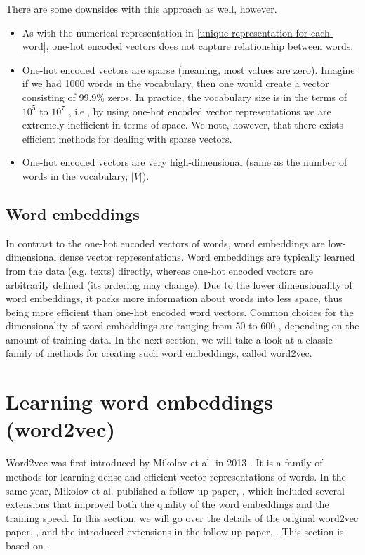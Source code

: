 There are some downsides with this approach as well, however.
\begin{itemize}
    \item As with the numerical representation in \cref{unique-representation-for-each-word}, one-hot encoded vectors does not capture relationship between words.
    \item One-hot encoded vectors are sparse (meaning, most values are zero). Imagine if we had 1000 words in the vocabulary, then one would create a vector consisting of 99.9\% zeros. In practice, the vocabulary size is in the terms of $10^5$ to $10^7$ \cite{mikolov2013b}, i.e., by using one-hot encoded vector representations we are extremely inefficient in terms of space. We note, however, that there exists efficient methods for dealing with sparse vectors.
    \item One-hot encoded vectors are very high-dimensional (same as the number of words in the vocabulary, $|V|$).
\end{itemize}

\subsection{Word embeddings}
In contrast to the one-hot encoded vectors of words, word embeddings are low-dimensional dense vector representations. Word embeddings are typically learned from the data (e.g. texts) directly, whereas one-hot encoded vectors are arbitrarily defined (its ordering may change). Due to the lower dimensionality of word embeddings, it packs more information about words into less space, thus being more efficient than one-hot encoded word vectors. Common choices for the dimensionality of word embeddings are ranging from 50 to 600 \cite{mikolov2013a}, depending on the amount of training data. In the next section, we will take a look at a classic family of methods for creating such word embeddings, called word2vec.

\section{Learning word embeddings (word2vec)}
\label{sec:word2vec}
Word2vec was first introduced by Mikolov et al. in 2013 \cite{mikolov2013a}. It is a family of methods for learning dense and efficient vector representations of words. In the same year, Mikolov et al. published a follow-up paper, \cite{mikolov2013b}, which included several extensions that improved both the quality of the word embeddings and the training speed. In this section, we will go over the details of the original word2vec paper, \cite{mikolov2013a}, and the introduced extensions in the follow-up paper, \cite{mikolov2013b}. This section is based on \cites{mikolov2013a}{mikolov2013b}.

